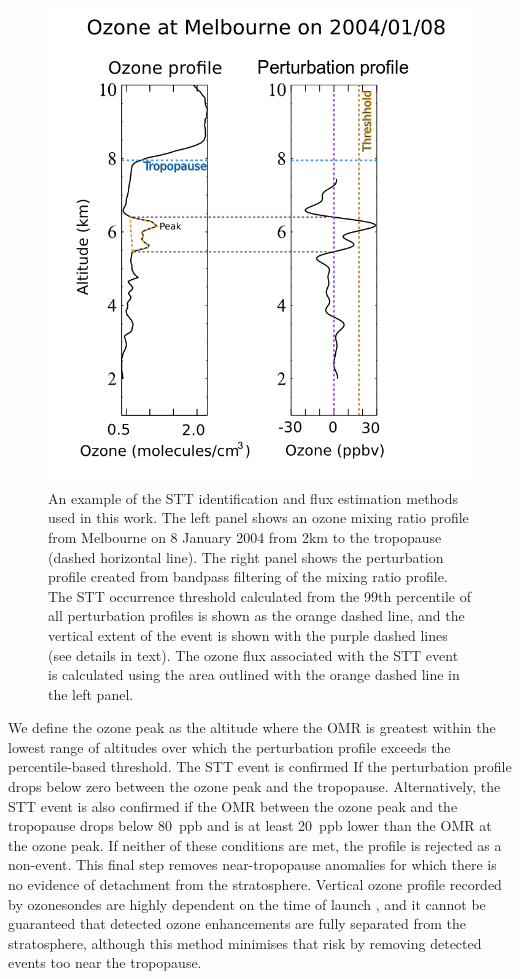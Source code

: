 \documentclass{article}
\begin{document}
    \begin{figure}[!htbp]
      \begin{center}
      \includegraphics[width=0.8\columnwidth]{figures/filtereg.png}
      \caption{ An example of the STT identification and flux estimation methods used in this work. 
	The left panel shows an ozone mixing ratio profile from Melbourne on 8 January 2004 from 2km to the tropopause (dashed horizontal line).
	The right panel shows the perturbation profile created from bandpass filtering of the mixing ratio profile. The STT occurrence threshold calculated from the 99th percentile of all perturbation profiles is shown as the orange dashed line, and the vertical extent of the event is shown with the purple dashed lines (see details in text).
	The ozone flux associated with the STT event is calculated using the area outlined with the orange dashed line in the left panel.
      }
      \label{fig:filterEG}
      \end{center}
    \end{figure}
   
       
    We define the ozone peak as the altitude where the OMR is greatest within the lowest range of altitudes over which the perturbation profile exceeds the percentile-based threshold.
    The STT event is confirmed If the perturbation profile drops below zero between the ozone peak and the tropopause. 
    Alternatively, the STT event is also confirmed if the OMR between the ozone peak and the tropopause drops below 80~ppb and is at least 20~ppb lower than the OMR at the ozone peak. 
    If neither of these conditions are met, the profile is rejected as a non-event.
    This final step removes near-tropopause anomalies for which there is no evidence of detachment from the stratosphere.
    Vertical ozone profile recorded by ozonesondes are highly dependent on the time of launch \citep{Sprenger2003}, and it cannot be guaranteed that detected ozone enhancements are fully separated from the stratosphere, although this method minimises that risk by removing detected events too near the tropopause.
\end{document}
